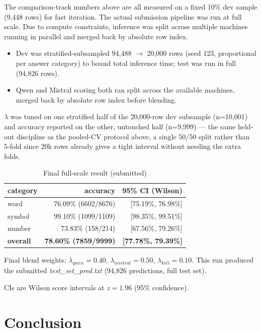 \documentclass[11pt,conference]{IEEEtran}
\newcommand{\code}[1]{\textit{#1}}
\begin{document}
The comparison-track numbers above are all measured on a fixed 10\% dev
sample (9,448 rows) for fast iteration. The actual submission pipeline was
run at full scale. Due to compute constraints, inference was split across
multiple machines running in parallel and merged back by absolute row index.
\begin{itemize}
\item Dev was stratified-subsampled 94,488 $\to$ 20,000 rows (seed 123,
proportional per answer category) to bound total inference time; test was
run in full (94,826 rows).
\item Qwen and Mistral scoring both ran split across the available
machines, merged back by absolute row index before blending.
\end{itemize}

$\lambda$ was tuned on one stratified half of the 20,000-row dev subsample
(n=10,001) and accuracy reported on the other, untouched half (n=9,999) ---
the same held-out discipline as the pooled-CV protocol above, a single 50/50
split rather than 5-fold since 20k rows already gives a tight interval
without needing the extra folds.

\begin{table}[!t]
\centering
\large
\caption{Final full-scale result (submitted)}
\label{tab:final}
\begin{tabular}{lrr}
\toprule
category & accuracy & 95\% CI (Wilson) \\
\midrule
word & 76.09\% (6602/8676) & [75.19\%, 76.98\%] \\
symbol & 99.10\% (1099/1109) & [98.35\%, 99.51\%] \\
number & 73.83\% (158/214) & [67.56\%, 79.26\%] \\
\midrule
\textbf{overall} & \textbf{78.60\% (7859/9999)} & \textbf{[77.78\%, 79.39\%]} \\
\bottomrule
\end{tabular}
\end{table}

Final blend weights: $\lambda_{qwen}=0.40$, $\lambda_{mistral}=0.50$,
$\lambda_{kn5}=0.10$. This run produced the submitted \code{test\_set\_pred.txt}
(94,826 predictions, full test set).

CIs are Wilson score intervals at $z=1.96$ (95\% confidence).

\section{Conclusion}
\end{document}
